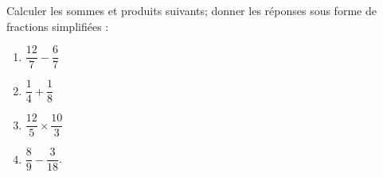 
\begin{exercice}\label{exo2smath-0003}

    Calculer les sommes et produits suivants; donner les réponses sous forme de fractions simplifiées :
    \begin{multicols}{4}
        \begin{enumerate}
            \item
                \( \dfrac{ 12 }{ 7 }-\dfrac{ 6 }{ 7 }\)
            \item
                \( \dfrac{ 1 }{ 4 }+\dfrac{ 1 }{ 8 } \)
            \item
                \( \dfrac{ 12 }{ 5 }\times \dfrac{ 10 }{ 3 }\)
            \item
                \( \dfrac{ 8 }{ 9 } - \dfrac{ 3 }{ 18 }\).
        \end{enumerate}
    \end{multicols}


\end{exercice}
